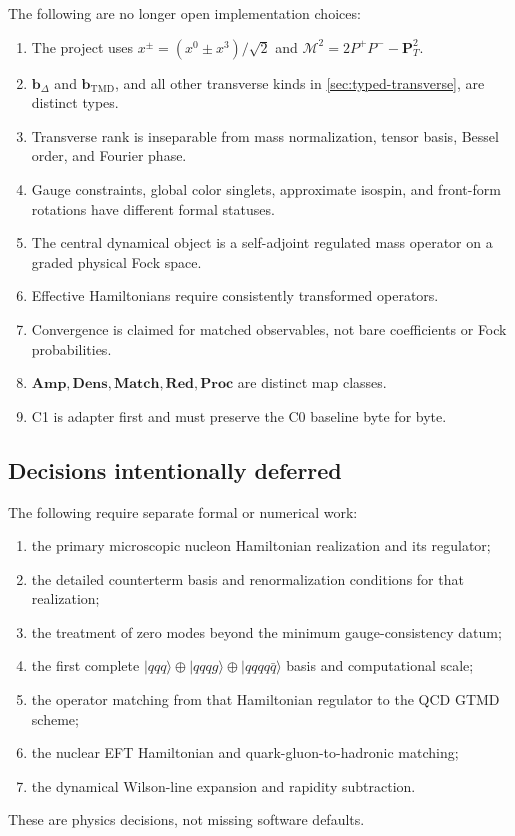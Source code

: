 \documentclass[11pt]{article}
\newcommand{\PT}{\bm{P}_{T}}
\newcommand{\bD}{\bm{b}_{\Delta}}
\newcommand{\bM}{\bm{b}_{\mathrm{TMD}}}
\newcommand{\Amp}{\mathbf{Amp}}
\newcommand{\Dens}{\mathbf{Dens}}
\newcommand{\Match}{\mathbf{Match}}
\newcommand{\Red}{\mathbf{Red}}
\newcommand{\Proc}{\mathbf{Proc}}
\newcommand{\cM}{\mathcal M}
\begin{document}
The following are no longer open implementation choices:
\begin{enumerate}
\item The project uses \(x^\pm=(x^0\pm x^3)/\sqrt2\) and
\(\cM^2=2P^+P^- -\PT^2\).
\item \(\bD\) and \(\bM\), and all other transverse kinds in
\cref{sec:typed-transverse}, are distinct types.
\item Transverse rank is inseparable from mass normalization, tensor basis,
Bessel order, and Fourier phase.
\item Gauge constraints, global color singlets, approximate isospin, and
front-form rotations have different formal statuses.
\item The central dynamical object is a self-adjoint regulated mass operator
on a graded physical Fock space.
\item Effective Hamiltonians require consistently transformed operators.
\item Convergence is claimed for matched observables, not bare coefficients
or Fock probabilities.
\item \(\Amp,\Dens,\Match,\Red,\Proc\) are distinct map classes.
\item C1 is adapter first and must preserve the C0 baseline byte for byte.
\end{enumerate}

\subsection{Decisions intentionally deferred}

The following require separate formal or numerical work:
\begin{enumerate}
\item the primary microscopic nucleon Hamiltonian realization and its
regulator;
\item the detailed counterterm basis and renormalization conditions for that
realization;
\item the treatment of zero modes beyond the minimum gauge-consistency datum;
\item the first complete \(|qqq\rangle\oplus|qqqg\rangle\oplus
|qqqq\bar q\rangle\) basis and computational scale;
\item the operator matching from that Hamiltonian regulator to the QCD GTMD
scheme;
\item the nuclear EFT Hamiltonian and quark-gluon-to-hadronic matching;
\item the dynamical Wilson-line expansion and rapidity subtraction.
\end{enumerate}
These are physics decisions, not missing software defaults.
\end{document}
